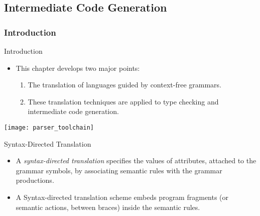%

\begin{bibunit}[apalike]

\part[author={Stéphane GALLAND},label={chap:intermediate_code_generation}]{Intermediate Code Generation}

\tableofcontentslide

\section{Introduction}

\begin{frame}{Introduction}
	\vfill
	\begin{itemize}
	\item This chapter develops two major points:
		\vfill
		\begin{enumerate}
		\item The translation of languages guided by context-free grammars.
		\vfill
		\item These translation techniques are applied to type checking and intermediate code generation.
		\end{enumerate}
	\end{itemize}
	\vfill
	\texttt{[image: parser\_toolchain]}
\end{frame}

\begin{frame}{Syntax-Directed Translation}
	\begin{itemize}
	\item A \emph{syntax-directed translation} specifies the values of attributes, attached to the grammar symbols, by associating semantic rules with the grammar productions.
		\begin{sdd}
		\pdots
		\end{sdd}
	\vspace{1em}
	\item A Syntax-directed translation scheme embeds program fragments (or semantic actions, between braces) inside the semantic rules.
	\end{itemize}
\end{frame}


\end{bibunit}
